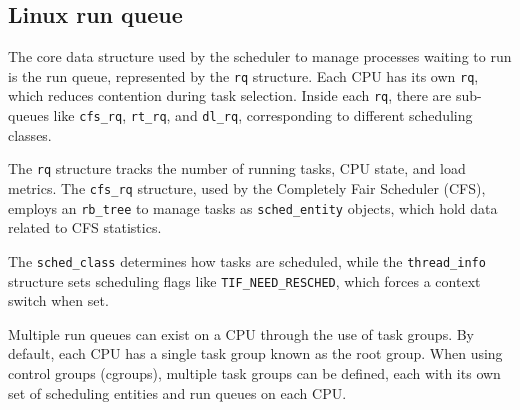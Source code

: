 \subsection{Linux run queue}
The core data structure used by the scheduler to manage processes waiting to run is the run queue, represented by the \texttt{rq} structure. 
Each CPU has its own \texttt{rq}, which reduces contention during task selection. Inside each \texttt{rq}, there are sub-queues like \texttt{cfs\_rq}, \texttt{rt\_rq}, and \texttt{dl\_rq}, corresponding to different scheduling classes.

The \texttt{rq} structure tracks the number of running tasks, CPU state, and load metrics. 
The \texttt{cfs\_rq} structure, used by the Completely Fair Scheduler (CFS), employs an \texttt{rb\_tree} to manage tasks as \texttt{sched\_entity} objects, which hold data related to CFS statistics.

The \texttt{sched\_class} determines how tasks are scheduled, while the \texttt{thread\_info} structure sets scheduling flags like \texttt{TIF\_NEED\_RESCHED}, which forces a context switch when set.

Multiple run queues can exist on a CPU through the use of task groups. 
By default, each CPU has a single task group known as the root group. 
When using control groups (cgroups), multiple task groups can be defined, each with its own set of scheduling entities and run queues on each CPU.
















